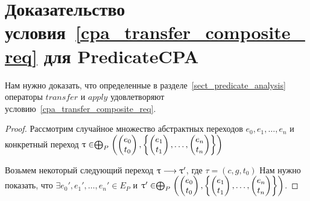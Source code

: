 \section{Доказательство условия~\ref{cpa_transfer_composite_req} для PredicateCPA}
\label{sect_transfer_predicate_proof}

Нам нужно доказать, что определенные в разделе~\ref{sect_predicate_analysis} операторы $transfer$ и $apply$ удовлетворяют условию~\ref{cpa_transfer_composite_req}.

\begin{proof}

Рассмотрим случайное множество абстрактных переходов $e_0, e_1, \dots, e_n$ и конкретный переход $
\uptau \in \mathrel{\bigoplus}_P
\left(
\begin{pmatrix}
e_0 \\
t_0 
\end{pmatrix},
\left\{
\begin{pmatrix}
e_1 \\
t_1 
\end{pmatrix},
\dots ,
\begin{pmatrix}
e_n \\
t_n 
\end{pmatrix}
\right\}
\right)$

Возьмем некоторый следующий переход $\uptau \longrightarrow \uptau'$, где $\tau = (c, g, t_0)$
Нам нужно показать, что 
$\exists e_0', e_1', \dots, e_n' \in E_P$ и  $
\uptau' \in \mathrel{\bigoplus}_P
\left(
\begin{pmatrix}
e_0 \\
t_0 
\end{pmatrix},
\left\{
\begin{pmatrix}
e_1 \\
t_1 
\end{pmatrix},
\dots ,
\begin{pmatrix}
e_n \\
t_n 
\end{pmatrix}
\right\}
\right)$.


\end{proof}

